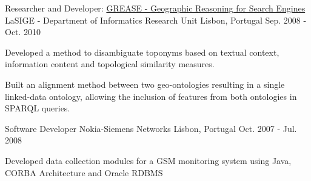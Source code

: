 \begin{cventries}
  \cventry
    {Researcher and Developer: \href{https://arquivo.pt/wayback/20181014115718/http://xldb.di.fc.ul.pt/wiki/Grease}{GREASE - Geographic Reasoning for Search Engines}} %
    {LaSIGE - Department of Informatics Research Unit } %
    {Lisbon, Portugal} %
    {Sep. 2008 - Oct. 2010} %
    {
      \begin{cvitems} %
        \item {Developed a method to disambiguate toponyms based on textual context, information content and topological similarity measures.}
        \item {Built an alignment method between two geo-ontologies resulting in a single linked-data ontology, allowing the inclusion of features from both ontologies in SPARQL queries.}
      \end{cvitems}
    }

  \cventry
    {Software Developer} %
    {Nokia-Siemens Networks} %
    {Lisbon, Portugal} %
    {Oct. 2007 - Jul. 2008} %
    {
      \begin{cvitems} %
        \item {Developed data collection modules for a GSM monitoring system using Java, CORBA Architecture and Oracle RDBMS}
      \end{cvitems}
    }

\end{cventries}
